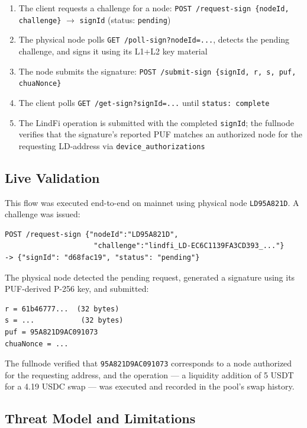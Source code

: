 \documentclass[11pt,a4paper]{article}
\begin{document}
\begin{enumerate}
    \item The client requests a challenge for a node: \texttt{POST /request-sign \{nodeId, challenge\}} $\to$ \texttt{signId} (status: \texttt{pending})
    \item The physical node polls \texttt{GET /poll-sign?nodeId=...}, detects the pending challenge, and signs it using its L1+L2 key material
    \item The node submits the signature: \texttt{POST /submit-sign \{signId, r, s, puf, chuaNonce\}}
    \item The client polls \texttt{GET /get-sign?signId=...} until \texttt{status: complete}
    \item The LindFi operation is submitted with the completed \texttt{signId}; the fullnode verifies that the signature's reported PUF matches an authorized node for the requesting LD-address via \texttt{device\_authorizations}
\end{enumerate}

\subsection{Live Validation}

This flow was executed end-to-end on mainnet using physical node \texttt{LD95A821D}. A challenge was issued:

\begin{verbatim}
POST /request-sign {"nodeId":"LD95A821D",
                     "challenge":"lindfi_LD-EC6C1139FA3CD393_..."}
-> {"signId": "d68fac19", "status": "pending"}
\end{verbatim}

The physical node detected the pending request, generated a signature using its PUF-derived P-256 key, and submitted:

\begin{verbatim}
r = 61b46777...  (32 bytes)
s = ...           (32 bytes)
puf = 95A821D9AC091073
chuaNonce = ...
\end{verbatim}

The fullnode verified that \texttt{95A821D9AC091073} corresponds to a node authorized for the requesting address, and the operation --- a liquidity addition of 5 USDT for a 4.19 USDC swap --- was executed and recorded in the pool's swap history.

\subsection{Threat Model and Limitations}
\end{document}
